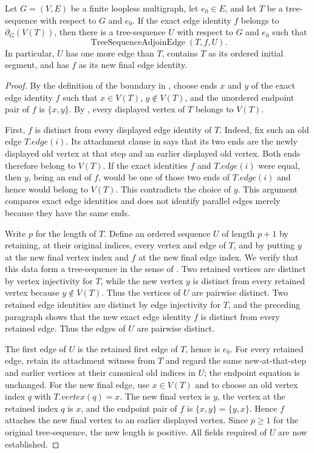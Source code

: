 \begin{lemma}
Let $G=(V,E)$ be a finite loopless multigraph, let $e_0\in E$, and let
$T$ be a tree-sequence with respect to $G$ and $e_0$.  If the exact edge
identity $f$ belongs to $\partial_G(V(T))$, then there is a tree-sequence
$U$ with respect to $G$ and $e_0$ such that
\[
  \operatorname{TreeSequenceAdjoinEdge}(T,f,U).
\]
In particular, $U$ has one more edge than $T$, contains $T$ as its ordered
initial segment, and has $f$ as its new final edge identity.
\end{lemma}
\begin{proof}
By the definition of the boundary in , choose ends
$x$ and $y$ of the exact edge identity $f$ such that
$x\in V(T)$, $y\notin V(T)$, and the unordered endpoint pair of $f$ is
$\{x,y\}$.  By , every displayed vertex
of $T$ belongs to $V(T)$.

First, $f$ is distinct from every displayed edge identity of $T$.  Indeed,
fix such an old edge $T.edge(i)$.  Its attachment clause in
 says that its two ends are the newly displayed old
vertex at that step and an earlier displayed old vertex.  Both ends
therefore belong to $V(T)$.  If the exact identities $f$ and $T.edge(i)$
were equal, then $y$, being an end of $f$, would be one of those two ends
of $T.edge(i)$ and hence would belong to $V(T)$.  This contradicts the
choice of $y$.  This argument compares exact edge identities and does not
identify parallel edges merely because they have the same ends.

Write $p$ for the length of $T$.  Define an ordered sequence $U$ of length
$p+1$ by retaining, at their original indices, every vertex and edge of
$T$, and by putting $y$ at the new final vertex index and $f$ at the new
final edge index.  We verify that this data form a tree-sequence in the
sense of .  Two retained vertices are distinct by
vertex injectivity for $T$, while the new vertex $y$ is distinct from every
retained vertex because $y\notin V(T)$.  Thus the vertices of $U$ are
pairwise distinct.  Two retained edge identities are distinct by edge
injectivity for $T$, and the preceding paragraph shows that the new exact
edge identity $f$ is distinct from every retained edge.  Thus the edges of
$U$ are pairwise distinct.

The first edge of $U$ is the retained first edge of $T$, hence is $e_0$.
For every retained edge, retain its attachment witness from $T$ and regard
the same new-at-that-step and earlier vertices at their canonical old
indices in $U$; the endpoint equation is unchanged.  For the new final
edge, use $x\in V(T)$ and  to choose an old
vertex index $q$ with $T.vertex(q)=x$.  The new final vertex is $y$, the
vertex at the retained index $q$ is $x$, and the endpoint pair of $f$ is
$\{x,y\}=\{y,x\}$.  Hence $f$ attaches the new final vertex to an earlier
displayed vertex.  Since $p\geq 1$ for the original tree-sequence, the new
length is positive.  All fields required of $U$ are now established.


\end{proof}
